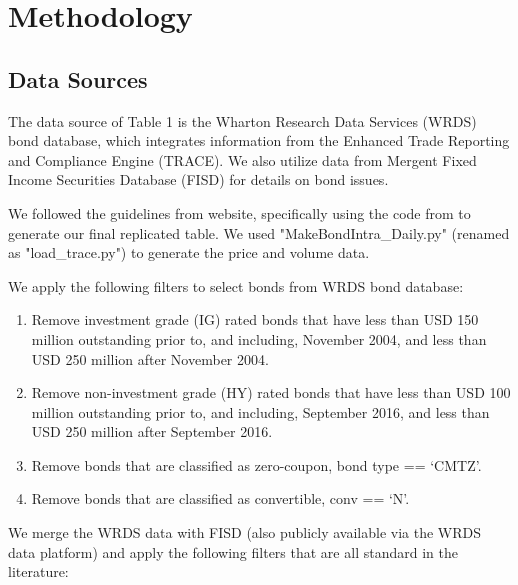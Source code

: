 \documentclass[12pt]{article}
\begin{document}
\section{Methodology}
\subsection{Data Sources}
The data source of Table 1 is the Wharton Research Data Services (WRDS) bond database, which integrates information from the Enhanced Trade Reporting and Compliance Engine (TRACE). We also utilize data from Mergent Fixed Income Securities Database (FISD) for details on bond issues. 

We followed the guidelines from \cite{OpenBondAssetPricing2023} website, specifically using the code from \cite{DickersonGithub2023} to generate our final replicated table. We used "MakeBondIntra\_Daily.py"  (renamed as "load\_trace.py") to generate the price and volume data. 

We apply the following filters to select bonds from WRDS bond database:

\begin{enumerate}
    \item Remove investment grade (IG) rated bonds that have less than USD 150 million outstanding prior to, and including, November 2004, and less than USD 250 million after November 2004.
    \item Remove non-investment grade (HY) rated bonds that have less than USD 100 million outstanding prior to, and including, September 2016, and less than USD 250 million after September 2016.
    \item Remove bonds that are classified as zero-coupon, bond type == ‘CMTZ’.
    \item Remove bonds that are classified as convertible, conv == ‘N’.
\end{enumerate}

We merge the WRDS data with FISD (also publicly available via the WRDS data platform) and apply the following filters that are all standard in the literature:
\end{document}
